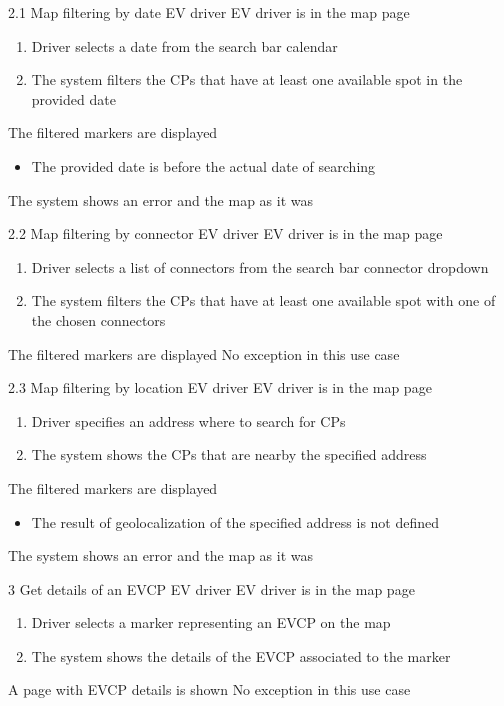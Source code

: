 \usecase
{2.1}
{Map filtering by date}
{EV driver}
{EV driver is in the map page}
{
    \begin{enumerate}
        \item Driver selects a date from the search bar calendar
        \item The system filters the CPs that have at least one available spot in the provided date
    \end{enumerate}
}
{The filtered markers are displayed}
{
    \begin{itemize}
        \item The provided date is before the actual date of searching
    \end{itemize}
}
{
    The system shows an error and the map as it was
}

\usecase
{2.2}
{Map filtering by connector}
{EV driver}
{EV driver is in the map page}
{
    \begin{enumerate}
        \item Driver selects a list of connectors from the search bar connector dropdown
        \item The system filters the CPs that have at least one available spot with one of the chosen connectors
    \end{enumerate}
}
{The filtered markers are displayed}
{
    No exception in this use case
}
{
}

\usecase
{2.3}
{Map filtering by location}
{EV driver}
{EV driver is in the map page}
{
    \begin{enumerate}
        \item Driver specifies an address where to search for CPs
        \item The system shows the CPs that are nearby the specified address
    \end{enumerate}
}
{The filtered markers are displayed}
{
    \begin{itemize}
        \item The result of geolocalization of the specified address is not defined
    \end{itemize}
}
{
    The system shows an error and the map as it was
}

\usecase
{3}
{Get details of an EVCP}
{EV driver}
{EV driver is in the map page}
{
    \begin{enumerate}
        \item Driver selects a marker representing an EVCP on the map
        \item The system shows the details of the EVCP associated to the marker
    \end{enumerate}
}
{A page with EVCP details is shown}
{
    No exception in this use case
}
{
}

